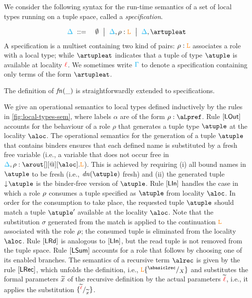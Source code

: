 We consider the following syntax for the run-time semantics of a set of local types running on a 
tuple space, called a {\em specification}.

\begin{eqnarray*}
  \envmv & \bnfdef & \emptyset \bnfmid
                  \envmv, \arole :  \aL \bnfmid
                  \envmv, \artupleat                  
\end{eqnarray*}
%
A specification is a multiset containing two kind of pairs:  $\rho :  \texttt{\textcolor{orange}L}$   associates a 
role with a local type; while $\artupleat$  indicates that a 
tuple of type $\atuple$ is available at locality ${\color{red}\ell}$. 
%
We sometimes write $\textcolor{cyan}{\Gamma}$ to denote a specification containing only
terms of the form $\artupleat$. 

The definition of ${\it fn}(\_)$ is straightforwardly  extended to specifications. 

We give an operational semantics to local types defined inductively by 
the rules in \cref{fig:local-types-sem}, where labels $\alpha$ are of the form 
$\arole : \aLpref$. Rule $\mathsf{[LOut]}$ 
accounts  for the behaviour of a role $\rho$ that  generates a tuple type $\atuple$ at the 
locality $\aloc$. The operational semantics for the generation of a tuple $\atuple$ that 
contains binders ensures that  each defined name  is substituted by a fresh free variable 
 (i.e., a variable that does not occur free in $\envmv, \arole : \arout[][@][\aloc].\aL$).
This is achieved by requiring  (i) all bound names in $\atuple$ to be fresh (i.e., $\dn\atuple$  fresh) and 
(ii)  the generated tuple $\eraseB\atuple$ is the binder-free version of $\atuple$. 
Rule $\mathsf{[LIn]}$ handles the case in which a role $\rho$
consumes  a tuple specified as $\atuple$ from locality $\aloc$. In order for the consumption to
take place, the  requested tuple $\atuple$ should match  a tuple $\atuple'$ available 
at the locality $\aloc$. 
Note that the substitution $\sigma$ generated from the match is applied 
to the continuation $\texttt{\textcolor{orange}L}$ associated with the role $\rho$; the
consumed tuple is eliminated from the locality $\aloc$. 
%
Rule $\mathsf{[LRd]}$ is analogous to $\mathsf{[LIn]}$, but the 
read tuple is not removed from the tuple space.
%
Rule $\mathsf{[LSum]}$ accounts for a role that follows by choosing one of 
its enabled branches. 
%
The semantics of a recursive term $\alrec$ is given by the rule
 $\mathsf{[LRec]}$, which unfolds the  definition, i.e., $\aL\sust X{\abasiclrec}$
 and substitutes the formal parameters $\widetilde{x}$ of the recursive
 definition by the actual parameters $\widetilde{{\color{red}\ell}}$, i.e., it applies
 the substitution $\{^{\widetilde{{\color{red}\ell}}} / _{\widetilde{x}}\}$.
 

